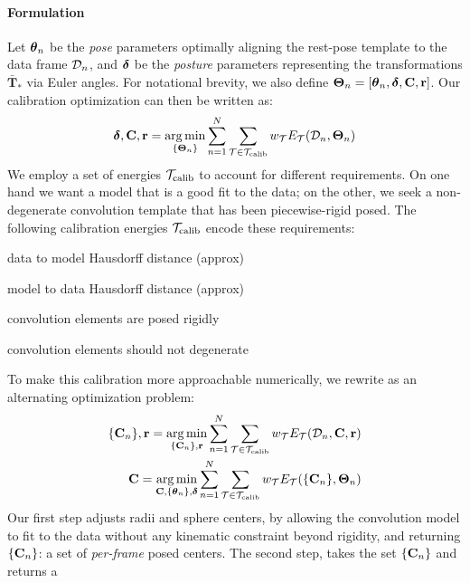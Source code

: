 \paragraph{Formulation}
Let $\boldsymbol{\theta}_n$ be the \emph{pose} parameters optimally aligning the rest-pose template to the data frame $\mathcal{D}_n$, and $\boldsymbol{\delta}$ be the \emph{posture} parameters representing the transformations $\mathbf{\bar{T}}_*$ via Euler angles. For notational brevity, we also define $\boldsymbol{\Theta}_n=[\boldsymbol{\theta}_n, \boldsymbol{\delta}, {\mathbf{C}}, {\mathbf{r}}]$. Our calibration optimization can then be written as:
% 
\begin{eqnarray}
\boldsymbol{\delta}, {\mathbf{C}}, {\mathbf{r}} = \operatorname*{arg\,min}_{\{\boldsymbol{\Theta}_n\}}
\sum_{n=1}^N 
\sum_{\mathcal{T} \in {\mathcal{T}_\text{calib}}} 
w_\mathcal{T} E_\mathcal{T}(\mathcal{D}_n, \boldsymbol{\Theta}_n)
\label{eq:calibration}
\end{eqnarray}
% 
We employ a set of energies ${\mathcal{T}_\text{calib}}$ to account for different requirements. On one hand we want a model that is a good fit to the data; on the other, we seek a non-degenerate convolution template that has been piecewise-rigid posed. The following calibration energies ${\mathcal{T}_\text{calib}}$ encode these requirements:
% 
\begin{description}[labelsep=0em,labelwidth=.4in,labelindent=1cm]
\item[d2m] data to model Hausdorff distance (approx)
\item[m2d] model to data Hausdorff distance (approx)
\item[rigid] convolution elements are posed rigidly
\item[valid] convolution elements should not degenerate
\end{description}
% 
To make this calibration more approachable numerically, we rewrite  as an alternating optimization problem:
% 
\begin{eqnarray}
{\{\mathbf{C}_n\}}, {\mathbf{r}} =
\operatorname*{arg\,min}_{{\{\mathbf{C}_n\}}, {\mathbf{r}}} 
\sum_{n=1}^N 
\sum_{\mathcal{T} \in {\mathcal{T}_\text{calib}}}
w_\mathcal{T} E_\mathcal{T}(\mathcal{D}_n, {\mathbf{C}}, {\mathbf{r}})
\label{eq:step1}
\\
{\mathbf{C}} =
\operatorname*{arg\,min}_{{\mathbf{C}},{\{\boldsymbol{\theta}_n\}},\boldsymbol{\delta}} 
\sum_{n=1}^N 
\sum_{\mathcal{T} \in {\mathcal{T}_\text{calib}}}
w_\mathcal{T} E_\mathcal{T}({\{\mathbf{C}_n\}}, \boldsymbol{\Theta}_n) 
\end{eqnarray}
% 
Our first step adjusts radii and sphere centers, by allowing the convolution model to fit to the data without any kinematic constraint beyond rigidity, and returning ${\{\mathbf{C}_n\}}$: a set of \emph{per-frame} posed centers.
The second step, takes the set ${\{\mathbf{C}_n\}}$ and returns a 


